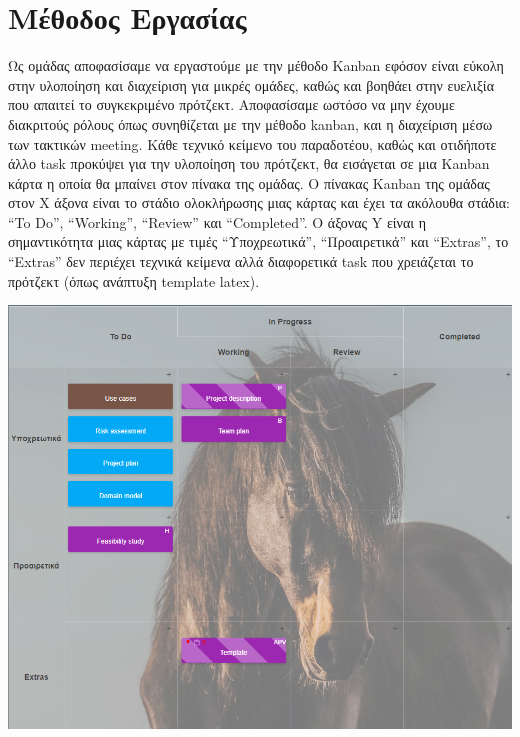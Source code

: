 \documentclass{article}
\begin{document}
\section{Μέθοδος Εργασίας}
Ως ομάδας αποφασίσαμε να εργαστούμε με την μέθοδο Kanban εφόσον είναι εύκολη στην υλοποίηση και διαχείριση για μικρές ομάδες, καθώς και βοηθάει στην ευελιξία που απαιτεί το συγκεκριμένο πρότζεκτ. Αποφασίσαμε ωστόσο να μην έχουμε διακριτούς ρόλους όπως συνηθίζεται με την μέθοδο kanban, και η διαχείριση μέσω των τακτικών meeting. Κάθε τεχνικό κείμενο του παραδοτέου, καθώς και οτιδήποτε άλλο task προκύψει για την υλοποίηση του πρότζεκτ, θα εισάγεται σε μια Kanban κάρτα η οποία θα μπαίνει στον πίνακα της ομάδας. 
Ο πίνακας Kanban της ομάδας στον X άξονα είναι το στάδιο ολοκλήρωσης μιας κάρτας και έχει τα ακόλουθα στάδια: “To Do”, “Working”, “Review” και “Completed”. O άξονας Y είναι η σημαντικότητα μιας κάρτας με τιμές “Υποχρεωτικά”, “Προαιρετικά” και “Extras”, το “Extras” δεν περιέχει τεχνικά κείμενα αλλά διαφορετικά task που χρειάζεται το πρότζεκτ (όπως ανάπτυξη template latex).

\vspace{20px}
\begin{center}
   \includegraphics[scale=0.5]{kanban.png}
\end{center}
\end{document}
